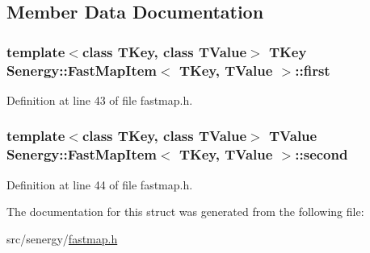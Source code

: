 \subsection{Member Data Documentation}
\hypertarget{struct_senergy_1_1_fast_map_item_a99e39296732f934331d581936e2ddb26}{
\subsubsection[{first}]{\setlength{\rightskip}{0pt plus 5cm}template$<$class T\-Key, class T\-Value$>$ T\-Key {\bf Senergy\-::\-Fast\-Map\-Item}$<$ T\-Key, T\-Value $>$\-::first}}\label{struct_senergy_1_1_fast_map_item_a99e39296732f934331d581936e2ddb26}


Definition at line 43 of file fastmap.\-h.

\hypertarget{struct_senergy_1_1_fast_map_item_a685a9e654410404e550d65acd951c7ca}{
\subsubsection[{second}]{\setlength{\rightskip}{0pt plus 5cm}template$<$class T\-Key, class T\-Value$>$ T\-Value {\bf Senergy\-::\-Fast\-Map\-Item}$<$ T\-Key, T\-Value $>$\-::second}}\label{struct_senergy_1_1_fast_map_item_a685a9e654410404e550d65acd951c7ca}


Definition at line 44 of file fastmap.\-h.



The documentation for this struct was generated from the following file\-:\begin{DoxyCompactItemize}
\item 
src/senergy/\hyperlink{fastmap_8h}{fastmap.\-h}\end{DoxyCompactItemize}
